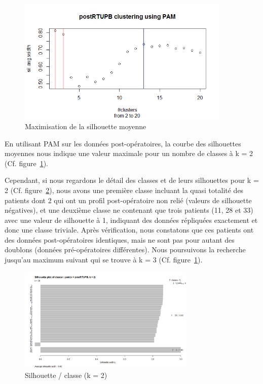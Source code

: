 %
%

\begin{figure}[H]
\centering
\includegraphics[width=0.90\textwidth]{../Fig/RTUPB/rtupb-elbow-post.png}
\caption{Maximisation de la silhouette moyenne }
\label{fig-rtupb-post-elbow}
\end{figure}

En utilisant PAM sur les données post-opératoires, la courbe des silhouettes moyennes
nous indique une valeur maximale pour un nombre de classes à k = 2 (Cf. figure~\ref{fig-rtupb-post-elbow}).

Cependant, si nous regardons le détail des classes et de leurs silhouettes pour k = 2 (Cf. figure~\ref{fig-rtupb-post-pam-k2}),
nous avons une première classe incluant la quasi totalité des patients dont 2 qui ont un profil post-opératoire non relié (valeurs de silhouette négatives), et une deuxième classe ne contenant que trois patients (11, 28 et 33)
avec une valeur de silhouette à 1, indiquant des données répliquées exactement et donc une classe triviale.
Après vérification, nous constatons que ces patients ont des données post-opératoires identiques, mais ne sont pas pour autant des doublons (données pré-opératoires différentes). Nous poursuivons la recherche jusqu'au maximum suivant qui se trouve à k = 3 (Cf. figure~\ref{fig-rtupb-post-elbow}).

\begin{figure}[H]
\centering
\includegraphics[width=0.75\textwidth]{../Fig/RTUPB/rtupb-sil-k2-post.png}
\caption{Silhouette / classe (k = 2) }
\label{fig-rtupb-post-pam-k2}
\end{figure}

